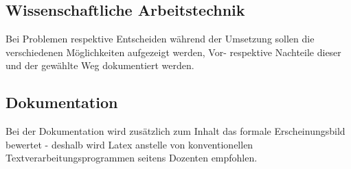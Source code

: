 \subsection{Wissenschaftliche Arbeitstechnik}
Bei Problemen respektive Entscheiden w\"ahrend der Umsetzung sollen die verschiedenen M\"oglichkeiten aufgezeigt werden, Vor- respektive Nachteile dieser und der gew\"ahlte Weg dokumentiert werden.
\subsection{Dokumentation}
Bei der Dokumentation wird zus\"atzlich zum Inhalt das formale Erscheinungsbild bewertet - deshalb wird Latex anstelle von konventionellen Textverarbeitungsprogrammen seitens Dozenten empfohlen.
